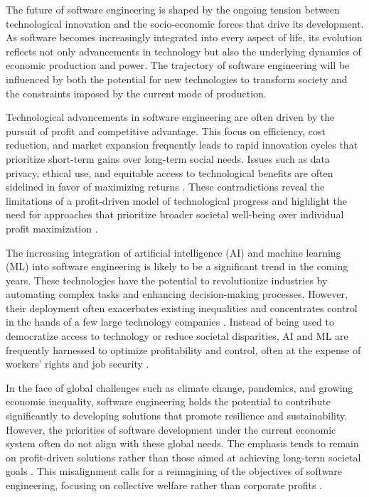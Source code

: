 \begin{refsection}
The future of software engineering is shaped by the ongoing tension between technological innovation and the socio-economic forces that drive its development. As software becomes increasingly integrated into every aspect of life, its evolution reflects not only advancements in technology but also the underlying dynamics of economic production and power. The trajectory of software engineering will be influenced by both the potential for new technologies to transform society and the constraints imposed by the current mode of production.

Technological advancements in software engineering are often driven by the pursuit of profit and competitive advantage. This focus on efficiency, cost reduction, and market expansion frequently leads to rapid innovation cycles that prioritize short-term gains over long-term social needs. Issues such as data privacy, ethical use, and equitable access to technological benefits are often sidelined in favor of maximizing returns \cite[pp.~77-80]{fuchs2014digital}. These contradictions reveal the limitations of a profit-driven model of technological progress and highlight the need for approaches that prioritize broader societal well-being over individual profit maximization \cite[pp.~123-125]{marx2008capital}.

The increasing integration of artificial intelligence (AI) and machine learning (ML) into software engineering is likely to be a significant trend in the coming years. These technologies have the potential to revolutionize industries by automating complex tasks and enhancing decision-making processes. However, their deployment often exacerbates existing inequalities and concentrates control in the hands of a few large technology companies \cite[pp.~182-184]{zuboff2020age}. Instead of being used to democratize access to technology or reduce societal disparities, AI and ML are frequently harnessed to optimize profitability and control, often at the expense of workers' rights and job security \cite[pp.~101-103]{moody2017on}.

In the face of global challenges such as climate change, pandemics, and growing economic inequality, software engineering holds the potential to contribute significantly to developing solutions that promote resilience and sustainability. However, the priorities of software development under the current economic system often do not align with these global needs. The emphasis tends to remain on profit-driven solutions rather than those aimed at achieving long-term societal goals \cite[pp.~141-144]{benkler2010wealth}. This misalignment calls for a reimagining of the objectives of software engineering, focusing on collective welfare rather than corporate profits \cite[pp.~98-101]{bollier2016commons}.


\end{refsection}
